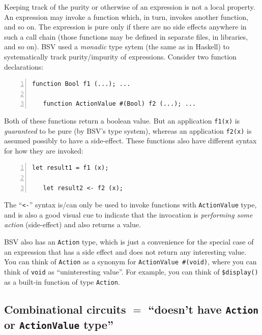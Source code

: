 Keeping track of the purity or otherwise of an expression is not a
local property.  An expression may invoke a function which, in turn,
invokes another function, and so on.  The expression is pure only if
there are no side effects anywhere in such a call chain (those
functions may be defined in separate files, in libraries, and so on).
BSV used a \emph{monadic} type sytem (the same as in Haskell) to
systematically track purity/impurity of expressions.  Consider two
function declarations:


{\small
\begin{Verbatim}[frame=single, numbers=left]
   function Bool f1 (...); ...

   function ActionValue #(Bool) f2 (...); ...
\end{Verbatim}
}

Both of these functions return a boolean value.  But an application
{\tt f1(x)} is \emph{guaranteed} to be pure (by BSV's type system),
whereas an application {\tt f2(x)} is assumed possibly to have a
side-effect.  These functions also have different syntax for how they
are invoked:

{\small
\begin{Verbatim}[frame=single, numbers=left]
   let result1 = f1 (x);

   let result2 <- f2 (x);
\end{Verbatim}
}

The ``\verb|<-|'' syntax is/can only be used to invoke functions with
\verb|ActionValue| type, and is also a good visual cue to indicate
that the invocation is \emph{performing some action} (side-effect) and
also returns a value.

BSV also has an \verb|Action| type, which is just a convenience for
the special case of an expression that has a side effect and does not
return any interesting value.  You can think of \verb|Action| as a
synonym for \verb|ActionValue #(void)|, where you can think of
\verb|void| as ``uninteresting value''.  For example, you can think of
\verb|$display()| as a built-in function of type \verb|Action|.


\subsection{Combinational circuits $=$ ``doesn't have {\tt Action} or {\tt ActionValue} type''}

